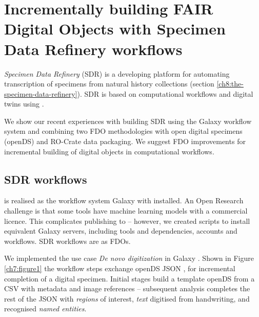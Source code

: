 \section[Incrementally building FAIR Digital Objects with the Specimen Data Refinery]{Incrementally building FAIR Digital Objects with Specimen Data Refinery workflows}
\label{ch7:incrementally-building-fair-digital-objects-with-specimen-data-refinery-workflows}

\emph{Specimen Data Refinery} (\acrshort{SDR}) is a developing platform for
automating transcription of specimens from natural history collections
\cite{Hardisty 2022} (section \vref{ch8:the-specimen-data-refinery}). SDR is
based on computational workflows and digital twins using
.

We show our recent experiences with building SDR using the Galaxy
workflow system and combining two FDO methodologies with open digital
specimens (\acrshort{openDS}) and RO-Crate data packaging. We suggest FDO
improvements for incremental building of digital objects in
computational workflows.

\subsection{SDR workflows}\label{ch7:sdr-workflows}

 is realised as the workflow system
Galaxy \cite{Afgan 2018} with
 installed. An Open
Research challenge is that some tools have machine learning models with
a commercial licence. This complicates publishing to
 -- however, we
created  scripts to install
equivalent Galaxy servers, including tools and dependencies, accounts
and workflows. SDR workflows are
 as
FDOs.

We implemented the use case \emph{De novo digitization} in Galaxy \cite{Brack 2022b}.
Shown in Figure \vref{ch7:figure1} the
workflow steps exchange \acrshort{openDS} \acrshort{JSON} \cite{Hardisty 2019a}, for
incremental completion of a digital specimen. Initial stages build a
template openDS from a \acrshort{CSV} with metadata and image references --
subsequent analysis completes the rest of the JSON with \emph{regions}
of interest, \emph{text} digitised from handwriting, and recognised
\emph{named entities}.


